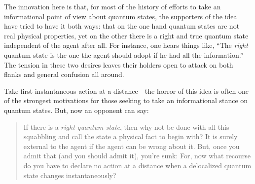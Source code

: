 \documentclass[aps,pra,superscriptaddress,12pt,tightenlines,nofootinbib]{revtex4-2}
\begin{document}
The innovation here is that, for most of the history of efforts to take an informational point of view about quantum states, the supporters of the idea have tried to have it both ways:  that on the one hand quantum states are not real physical properties, yet on the other there is a right and true quantum state independent of the agent after all. For instance, one hears things like, ``The {\it right\/} quantum state is the one the agent should adopt if he had all the information.''  The tension in these two desires leaves their holders open to attack on both flanks and general confusion all around.

Take first instantaneous action at a distance---the horror of this idea is often one of the strongest motivations for those seeking to take an informational stance on quantum states.  But, now an opponent can say:
\begin{quote}
\noindent If there is a {\it right quantum state}, then why not be done with all this squabbling and call the state a physical fact to begin with?  It is surely external to the agent if the agent can be wrong about it.  But, once you admit that (and you should admit it), you're sunk: For, now what recourse do you have to declare no action at a distance when a delocalized quantum state changes instantaneously?


\end{quote}
\end{document}
